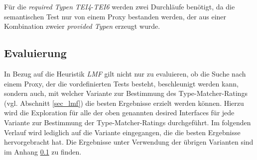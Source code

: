 \begin{multicols}{3}
\columnbreak
{}\columnbreak
{}
\end{multicols}
\noindent
Für die \emph{required Typen} \emph{TEI4}-\emph{TEI6} werden zwei Durchläufe benötigt, da die semantischen Test nur von einem Proxy bestanden werden, der aus einer Kombination zweier \emph{provided Typen} erzeugt wurde.

\subsection{Evaluierung}
In Bezug auf die Heuristik \emph{LMF} gilt nicht nur zu evaluieren, ob die Suche nach einem Proxy, der die vordefinierten Tests besteht, beschleunigt werden kann, sondern auch, mit welcher Variante zur Bestimmung des Type-Matcher-Ratings (vgl. Abschnitt \ref{sec_lmf}) die besten Ergebnisse erzielt werden können. Hierzu wird die Exploration für alle der oben genannten desired Interfaces für jede Variante zur Bestimmung der Type-Matcher-Ratings durchgeführt. Im folgenden Verlauf wird lediglich auf die Variante eingegangen, die die besten Ergebnisse hervorgebracht hat. Die Ergebnisse unter Verwendung der übrigen Varianten sind im Anhang \ref{} zu finden.

